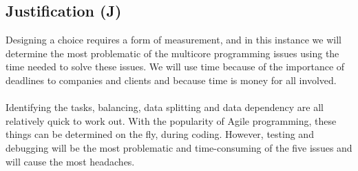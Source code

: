 \documentclass[12pt]{article}
\begin{document}
        \subsection{Justification (J)}
        Designing a choice requires a form of measurement, and in this instance we will determine the most problematic of the multicore programming issues using the time 
        needed to solve these issues. We will use time because of the importance of deadlines to companies and clients and because time is money for all involved. \\
        \\
        Identifying the tasks, balancing, data splitting and data dependency are all relatively quick to work out. With the popularity of Agile programming, these things 
        can be determined on the fly, during coding. However, testing and debugging will be the most problematic and time-consuming of the five issues and will cause the 
        most headaches. \\
        \\
\end{document}

